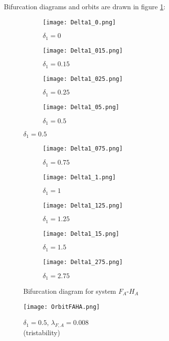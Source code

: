 \documentclass{article}
\newcommand{\lfa}{\lambda_{F, A}}
\begin{document}
\newpage 
Bifurcation diagrams and orbits are drawn in figure \ref{bifurcationDiagram}:

\begin{figure}[!ht]
\centering
\begin{subfigure}[b]{0.49\textwidth}
\texttt{[image: Delta1\_0.png]}
\caption{$\delta_1 = 0$}
\end{subfigure}
\begin{subfigure}[b]{0.49\textwidth}
\texttt{[image: Delta1\_015.png]}
\caption{$\delta_1 = 0.15$}
\end{subfigure}
\hfill
\begin{subfigure}[b]{0.49\textwidth}
\texttt{[image: Delta1\_025.png]}
\caption{$\delta_1 = 0.25$}
\end{subfigure}
\begin{subfigure}[b]{0.49\textwidth}
\texttt{[image: Delta1\_05.png]}
\caption{$\delta_1 = 0.5$}
\end{subfigure}
\end{figure}
\clearpage
\begin{figure}[!ht]
\centering
\continuedfloat
\begin{subfigure}[b]{0.49\textwidth}
\texttt{[image: Delta1\_075.png]}
\caption{$\delta_1 = 0.75$}
\end{subfigure}
\begin{subfigure}[b]{0.49\textwidth}
\texttt{[image: Delta1\_1.png]}
\caption{$\delta_1 = 1$}
\end{subfigure}\hfill
\begin{subfigure}[b]{0.49\textwidth}
\texttt{[image: Delta1\_125.png]}
\caption{$\delta_1 = 1.25$}
\end{subfigure}
\begin{subfigure}[b]{0.49\textwidth}
\texttt{[image: Delta1\_15.png]}
\caption{$\delta_1 = 1.5$}
\end{subfigure}\hfill
\begin{subfigure}[b]{0.49\textwidth}
\texttt{[image: Delta1\_275.png]}
\caption{$\delta_1 = 2.75$}
\end{subfigure}
\caption{Bifurcation diagram for system $F_A$-$H_A$}
\label{bifurcationDiagram}
\end{figure}

\begin{figure}[!ht]
\texttt{[image: OrbitFAHA.png]}
\caption{$\delta_1 = 0.5$, $\lfa = 0.008$ \\ (tristability)}
\end{figure}
\end{document}
